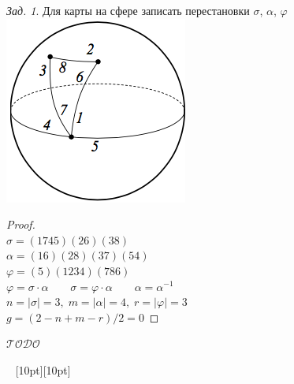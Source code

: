 \documentclass[a4paper,12pt]{article}
\theoremstyle{remark}
\newtheorem{problem}{Зад.}[section]
\def\iiTODO{\guillemotleft$\mathcal{TODO}$\guillemotright\textellipsis}
\begin{document}
\begin{problem}
	Для карты на сфере записать перестановки $\sigma$, $\alpha$, $\varphi$
	\\ \includegraphics{permutations-on-sphere.png}
\end{problem}
\begin{proof}
	\ \\
	$\sigma = (1 7 4 5) (2 6) (3 8)$ \\
	$\alpha = (1 6) (2 8) (3 7) (5 4)$ \\
	$\varphi = (5) (1 2 3 4) (7 8 6)$ \\
	$\varphi = \sigma \cdot \alpha \qquad \sigma = \varphi \cdot \alpha \qquad \alpha = \alpha^{-1}$ \\
	$n=|\sigma|=3 ,\; m=|\alpha|=4 ,\; r=|\varphi|=3$ \\
	$g = (2-n+m-r)/2 = 0$  
\end{proof}


\iiTODO




\vspace{48pt} \noindent \hrulefill~ \raisebox{-8pt}[10pt][10pt]{\Huge{}}~ \hrulefill
\end{document}
